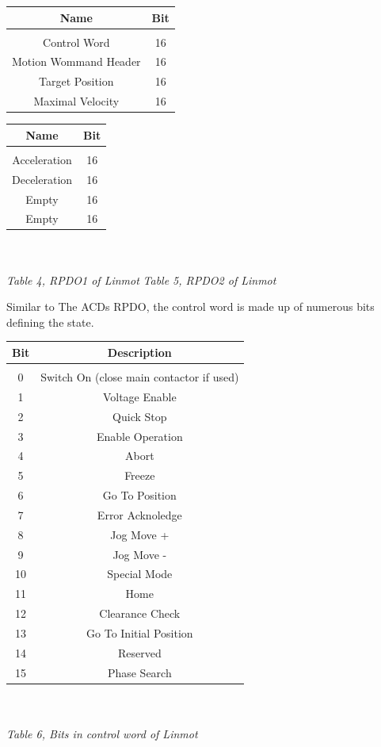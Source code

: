 \begin{tabular}{|c|c|}
	\hline 
	Name & Bit  \\ 
	\hline 
	& \\ 
	\hline 
	Control Word & 16 \\ 
	\hline 
	Motion Wommand Header & 16 \\ 
	\hline 
	Target Position & 16 \\ 
	\hline 
	Maximal Velocity & 16 \\ 
	\hline 
\end{tabular}
\quad
\begin{tabular}{|c|c|}
	\hline 
	Name & Bit \\ 
	\hline 
	&   \\ 
	\hline 
	Acceleration & 16 \\ 
	\hline 
	Deceleration & 16 \\ 
	\hline 
	Empty & 16\\ 
	\hline 
	Empty & 16 \\ 
	\hline 
\end{tabular}
\\
\\
\textit{Table 4, RPDO1 of Linmot \; \; \; \; \; \;}
\quad
\textit{Table 5, RPDO2 of Linmot} 

Similar to The ACDs RPDO, the control word is made up of numerous bits defining the state.

\begin{tabular}{|c|c|}
	\hline 
	Bit & Description \\ 
	\hline 
	&   \\ 
	\hline 
	0 &  Switch On (close main contactor if used)\\ 
	\hline 
	1 & Voltage Enable\\ 
	\hline 
	2 & Quick Stop\\ 
	\hline 
	3 & Enable Operation\\ 
	\hline 
	4 & Abort\\
	\hline
	5 & Freeze\\
	\hline
	6 & Go To Position\\
	\hline
	7 & Error Acknoledge\\
	\hline
	8 & Jog Move +\\
	\hline
	9 & Jog Move -\\
	\hline
	10 & Special Mode\\
	\hline
	11 & Home\\
	\hline
	12 & Clearance Check\\
	\hline
	13 & Go To Initial Position\\ 
	\hline
	14 & Reserved\\
	\hline
	15 & Phase Search\\
	\hline
\end{tabular} 
\\
\\
\textit{Table 6, Bits in control word of Linmot}

